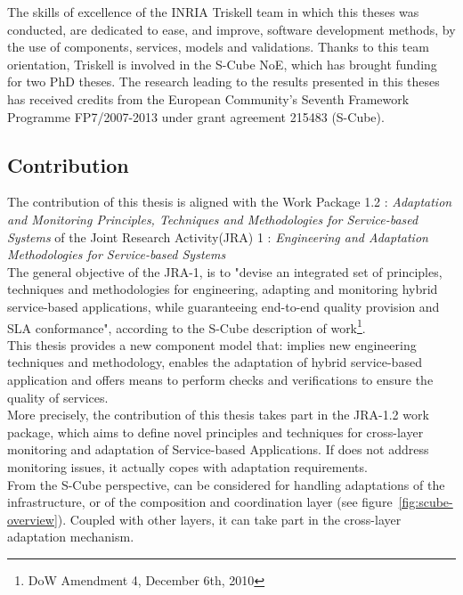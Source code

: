The skills of excellence of the INRIA Triskell team in which this theses was conducted, are dedicated to ease, and improve, software development methods, by the use of components, services, models and validations. Thanks to this team orientation, Triskell is involved in the S-Cube NoE, which has brought funding for two PhD theses. The research leading to the results presented in this theses has received credits from the European Community’s Seventh Framework Programme FP7/2007-2013 under grant agreement 215483 (S-Cube).\\

\subsection{Contribution}

The contribution of this thesis is aligned with the Work Package 1.2 : {\it Adaptation and Monitoring Principles, Techniques and Methodologies for Service-based Systems} of the Joint Research Activity(JRA) 1 : {\it Engineering and Adaptation Methodologies for Service-based Systems}\\

The general objective of the JRA-1, is to "devise an integrated set of principles, techniques and methodologies for engineering, adapting and monitoring hybrid service-based applications, while guaranteeing end-to-end quality provision and SLA conformance", according to the S-Cube description of work\footnote{DoW Amendment 4, December 6th, 2010}.\\
This thesis provides a new component model that: implies new engineering techniques and methodology, enables the adaptation of hybrid service-based application and offers means to perform checks and verifications to ensure the quality of services.\\

More precisely, the contribution of this thesis takes part in the JRA-1.2 work package, which aims to define novel principles and techniques for cross-layer monitoring and adaptation of Service-based Applications. If \enti{} does not address monitoring issues, it actually copes with adaptation requirements.\\

From the S-Cube perspective, \enti{} can be considered for handling adaptations of the infrastructure, or of the composition and coordination layer (see figure~\ref{fig:scube-overview}). Coupled with other layers, it can take part in the cross-layer adaptation mechanism.






